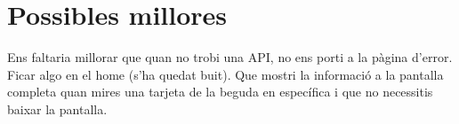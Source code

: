 \section{Possibles millores}

Ens faltaria millorar que quan no trobi una API, no ens porti a la pàgina d'error.
Ficar algo en el home (s'ha quedat buit).
Que mostri la informació a la pantalla completa quan mires una tarjeta de la beguda en específica i que no necessitis baixar la pantalla.
